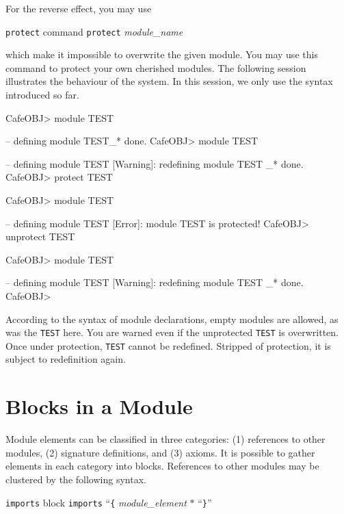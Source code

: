 \documentclass[a4paper]{memoir}
\begin{document}
For the reverse effect, you may use

\begin{bsyntax} \texttt{protect} command  \Hline
\texttt{protect} \textit{module\_name}
\end{bsyntax}

which make it impossible to overwrite the given module. You may use
this command to protect your own cherished modules.
The following session illustrates the behaviour of the system.
In this session, we only use the syntax introduced so far.
\begin{vvtm}
\begin{ccode}
  CafeOBJ> module TEST { }

  -- defining module TEST_* done.
  CafeOBJ> module TEST { }

  -- defining module TEST
  [Warning]: redefining module TEST _* done.
  CafeOBJ> protect TEST

  CafeOBJ> module TEST { }

  -- defining module TEST
  [Error]: module TEST is protected!
  CafeOBJ> unprotect TEST

  CafeOBJ> module TEST { }

  -- defining module TEST
  [Warning]: redefining module TEST _* done.
  CafeOBJ> 
\end{ccode}
\end{vvtm}
According to the syntax of module declarations, empty modules
are allowed, as was the \verb|TEST| here.
You are warned even if the unprotected \verb|TEST| is overwritten.
Once under protection, \verb|TEST| cannot be redefined. Stripped
of protection, it is subject to redefinition again.

\section{Blocks in a Module}\label{sec:p2-blocks-in-mod}

Module elements can be classified in three categories: (1) references
to other modules, (2) signature definitions,
and (3) axioms.
It is possible to gather elements in each category into blocks.
References to other modules may be clustered by the following syntax.

\begin{bsyntax} \texttt{imports} block  \Hline
\texttt{imports} ``\texttt{\{} \textit{module\_element} $*$ ``\texttt{\}}''
\end{bsyntax}
\end{document}
